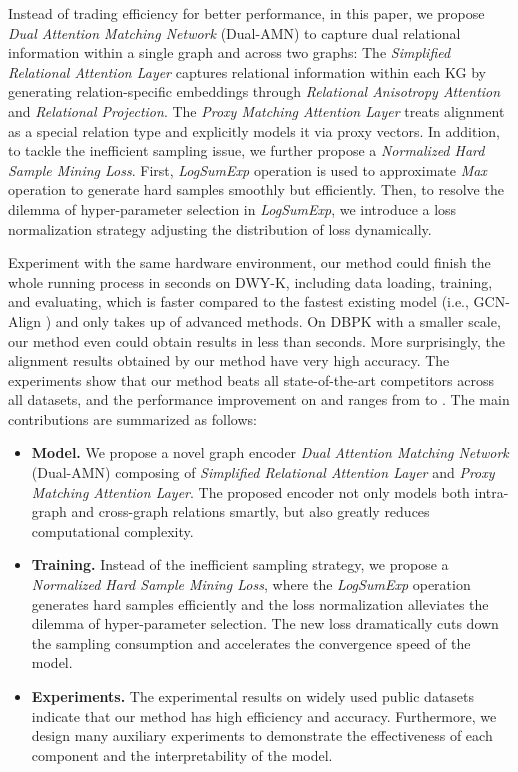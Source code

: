 \documentclass[sigconf]{acmart}
\begin{document}
Instead of trading efficiency for better performance, in this paper, we propose \emph{Dual Attention Matching Network} (Dual-AMN) to capture dual relational information within a single graph and across two graphs:
The \emph{Simplified Relational Attention Layer} captures relational information within each KG by generating relation-specific embeddings through \emph{Relational Anisotropy Attention} and \emph{Relational Projection}.
The \emph{Proxy Matching Attention Layer} treats alignment as a special relation type and explicitly models it via proxy vectors.
In addition, to tackle the inefficient sampling issue, we further propose a \emph{Normalized Hard Sample Mining Loss}.
First, \emph{LogSumExp} operation is used to approximate \emph{Max} operation to generate hard samples smoothly but efficiently.
Then, to resolve the dilemma of hyper-parameter selection in \emph{LogSumExp}, we introduce a loss normalization strategy adjusting the distribution of loss dynamically.


Experiment with the same hardware environment, our method could finish the whole running process in  seconds on DWY-K, including data loading, training, and evaluating, which is  faster compared to the fastest existing model (i.e., GCN-Align \cite{DBLP:conf/emnlp/WangLLZ18}) and only takes up  of advanced methods.
On DBPK with a smaller scale, our method even could obtain results in less than  seconds.
More surprisingly, the alignment results obtained by our method have very high accuracy.
The experiments show that our method beats all state-of-the-art competitors across all datasets, and the performance improvement on  and  ranges from  to .
The main contributions are summarized as follows:
\begin{itemize}
  \item \textbf{Model.}
  We propose a novel graph encoder  \emph{Dual Attention Matching Network} (Dual-AMN) composing of \emph{Simplified Relational Attention Layer} and \emph{Proxy Matching Attention Layer}.
  The proposed encoder not only models both intra-graph and cross-graph relations smartly, but also greatly reduces computational complexity.
  \item \textbf{Training.}
  Instead of the inefficient sampling strategy, we propose a \emph{Normalized Hard Sample Mining Loss}, where the \emph{LogSumExp} operation generates hard samples efficiently and the loss normalization alleviates the dilemma of hyper-parameter selection.
  The new loss dramatically cuts down the sampling consumption and accelerates the convergence speed of the model.
  \item \textbf{Experiments.}
  The experimental results on widely used public datasets indicate that our method has high efficiency and accuracy.
  Furthermore, we design many auxiliary experiments to demonstrate the effectiveness of each component and the interpretability of the model.
\end{itemize}
\end{document}

